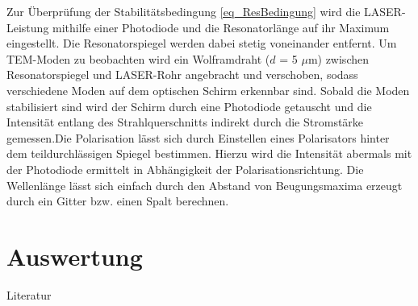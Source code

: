 Zur Überprüfung der Stabilitätsbedingung \eqref{eq_ResBedingung} wird die LASER-Leistung mithilfe einer Photodiode und die Resonatorlänge auf ihr Maximum eingestellt. Die 
Resonatorspiegel werden dabei stetig voneinander entfernt. Um TEM-Moden zu beobachten wird ein Wolframdraht ($d$ = 5 $\mu$m) zwischen Resonatorspiegel und LASER-Rohr angebracht und verschoben, sodass verschiedene
Moden auf dem optischen Schirm erkennbar sind. Sobald die Moden stabilisiert sind wird der Schirm durch eine Photodiode getauscht und die Intensität 
entlang des Strahlquerschnitts indirekt durch die Stromstärke gemessen.Die Polarisation lässt sich durch Einstellen eines Polarisators hinter dem teildurchlässigen Spiegel bestimmen. Hierzu wird die Intensität abermals mit
der Photodiode ermittelt in Abhängigkeit der Polarisationsrichtung. Die Wellenlänge lässt sich einfach durch den Abstand von Beugungsmaxima erzeugt
durch ein Gitter bzw. einen Spalt berechnen.
\section{Auswertung}

\parskip 340pt
\Large{Literatur}\\\\





